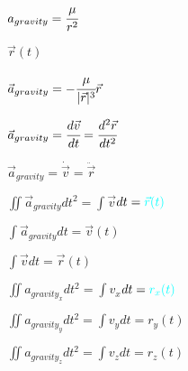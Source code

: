 \documentclass{article}
\begin{document}
\color{magenta}

\begin{center}\huge{
	$
	a_{gravity}=\cfrac{\mu}{r^2}
	$
}
\end{center}

\color{cyan}
\begin{center}\huge{
	$\vec{r}(t)$
}
\end{center}

\color{magenta}
\begin{center}\huge{
$
\vec{a}_{gravity}=
-\cfrac{\mu}{|\vec{r}|^3}\vec{r}
$
}\end{center}

\begin{center}\huge{
$
\vec{a}_{gravity}=
\cfrac{d\vec{v}}{dt}=\cfrac{d^2\vec{r}}{dt^2}
$
}\end{center}

\begin{center}\huge{
$
\vec{a}_{gravity}=
\dot{\vec{v}}=\ddot{\vec{r}}
$
}\end{center}


\begin{center}\huge{
$\displaystyle
\iint \vec{a}_{gravity}$\space$ dt^2 =
\displaystyle
\int  \vec{v}$\space$ dt =
\color{cyan}\vec{r}(t)
$
}\end{center}
\color{magenta}


\begin{center}\huge{
$\displaystyle
\int \vec{a}_{gravity}$\space$ dt =
\displaystyle
\vec{v}(t)
$
}\end{center}
\color{magenta}

\begin{center}\huge{
$\displaystyle
\int \vec{v}$\space$ dt =
\displaystyle
\vec{r}(t)
$
}\end{center}
\color{magenta}


\begin{center}\huge{
$\displaystyle
\iint a_{gravity_x}$\space$ dt^2 =
\displaystyle
\int  v_x$\space$ dt =
\color{cyan}
r_x(t)
$
}\end{center}
\color{magenta}

\begin{center}\huge{
$\displaystyle
\iint a_{gravity_y}$\space$ dt^2 =
\displaystyle
\int  v_y$\space$ dt =
r_y(t)
$
}\end{center}

\begin{center}\huge{
$\displaystyle
\iint a_{gravity_z}$\space$ dt^2 =
\displaystyle
\int  v_z$\space$ dt =
r_z(t)
$
}\end{center}
\end{document}
